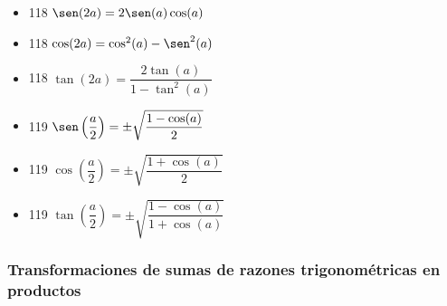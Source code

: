\documentclass[11pt]{article}
\begin{document}
\begin{itemize}
\item 118 \(\sen(2a) = 2\sen(a)\cos(a)\)

\item 118 \(\cos(2a) = \cos^{2}(a) - \sen^2(a)\)

\item 118 \(\tan(2a) = \dfrac{2\tan(a)}{1 - \tan^{2}(a)}\)

\item 119 \(\sen\left(\dfrac{a}{2}\right) = \pm\sqrt{\dfrac{1-\cos(a)}{2}}\)
\end{itemize}


\begin{itemize}
\item 119 \(\cos\left(\dfrac{a}{2}\right) = \pm\sqrt{\dfrac{1+\cos(a)}{2}}\)
\end{itemize}


\begin{itemize}
\item 119 \(\tan\left(\dfrac{a}{2}\right) = \pm\sqrt{\dfrac{1-\cos(a)}{1+\cos(a)}}\)
\end{itemize}

\subsubsection{Transformaciones de sumas de razones trigonométricas en productos}
\label{sec:org26dd84b}
\end{document}

